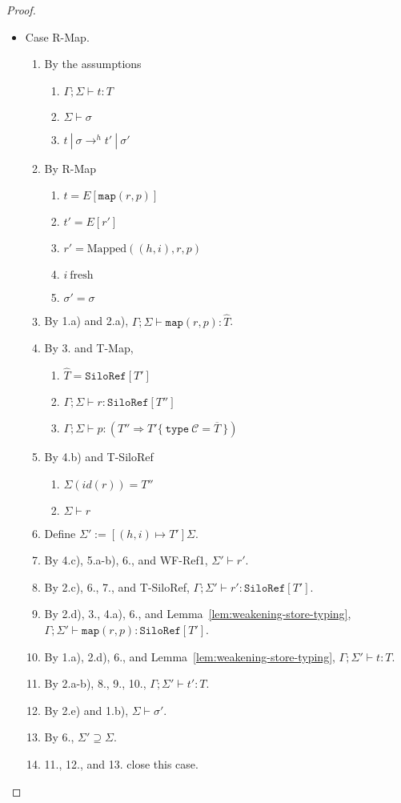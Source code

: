 \documentclass{article}
\theoremstyle{definition}
\newcommand{\seq}[1]{\overline{#1}}
\begin{document}
\begin{proof}
\begin{itemize}
\item Case R-Map.
\begin{enumerate}
\item By the assumptions
  \begin{enumerate}[label=(\alph*)]
  \item $\Gamma ; \Sigma \vdash t : T$
  \item $\Sigma \vdash \sigma$
  \item $t~|~\sigma \rightarrow^h t'~|~\sigma'$
  \end{enumerate}
\item By R-Map
  \begin{enumerate}[label=(\alph*)]
  \item $t = E[\texttt{map}(r, p)]$
  \item $t' = E[r']$
  \item $r' = \text{Mapped}((h, i), r, p)$
  \item $i~\text{fresh}$
  \item $\sigma' = \sigma$
  \end{enumerate}
\item By 1.a) and 2.a), $\Gamma ; \Sigma \vdash \texttt{map}(r, p) : \hat{T}$.
\item By 3. and T-Map,
  \begin{enumerate}[label=(\alph*)]
  \item $\hat{T} = \texttt{SiloRef}[T']$
  \item $\Gamma ; \Sigma \vdash r : \texttt{SiloRef}[T'']$
  \item $\Gamma ; \Sigma \vdash p : (T'' \Rightarrow T' \{~\texttt{type}~\mathcal{C} = \seq{T}~\})$
  \end{enumerate}
\item By 4.b) and T-SiloRef
  \begin{enumerate}[label=(\alph*)]
  \item $\Sigma(id(r)) = T''$
  \item $\Sigma \vdash r$
  \end{enumerate}
\item Define $\Sigma' := [(h, i) \mapsto T']\Sigma$.
\item By 4.c), 5.a-b), 6., and WF-Ref1, $\Sigma' \vdash r'$.
\item By 2.c), 6., 7., and T-SiloRef, $\Gamma ; \Sigma' \vdash r' : \texttt{SiloRef}[T']$.
\item By 2.d), 3., 4.a), 6., and Lemma~\ref{lem:weakening-store-typing}, $\Gamma ; \Sigma' \vdash \texttt{map}(r, p) : \texttt{SiloRef}[T']$.
\item By 1.a), 2.d), 6., and Lemma~\ref{lem:weakening-store-typing}, $\Gamma ; \Sigma' \vdash t : T$.
\item By 2.a-b), 8., 9., 10., $\Gamma ; \Sigma' \vdash t' : T$.
\item By 2.e) and 1.b), $\Sigma \vdash \sigma'$.
\item By 6., $\Sigma' \supseteq \Sigma$.
\item 11., 12., and 13. close this case.
\end{enumerate}


\end{itemize}
\end{proof}
\end{document}
